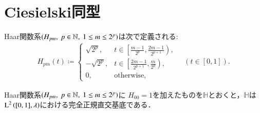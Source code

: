 \section{Ciesielski同型}
	\begin{screen}
		\begin{dfn}[Haar関数系]
			Haar関数系$(H_{pm},\ p \in \mathbb{N},\ 1 \leq m \leq 2^p)$は次で定義される:
			\begin{align}
				H_{pm}(t) \coloneqq
				\begin{cases}
					\sqrt{2^p}, & t \in \left[ \frac{m-1}{2^p},\frac{2m-1}{2^{p+1}} \right), \\
					-\sqrt{2^p}, & t \in \left[ \frac{2m-1}{2^{p+1}},\frac{m}{2^p} \right), \\
					0, & \mathrm{otherwise},
				\end{cases}
				\quad (t \in [0,1]).
			\end{align}
		\end{dfn}
	\end{screen}
	
	\begin{screen}
		\begin{thm}
			Haar関数系$(H_{pm},\ p \in \mathbb{N},\ 1 \leq m \leq 2^p)$に
			$H_{00} = 1$を加えたものを$\mathbb{H}$とおくと，$\mathbb{H}$は
			$\operatorname{L}^{2} \left([0,1],\lambda\right)$における完全正規直交基底である．
			\label{thm:Haar_functions_orthogonal_basis}
		\end{thm}
	\end{screen}
	
